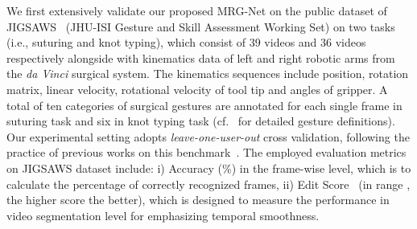 \documentclass[letterpaper, 10 pt, conference]{ieeeconf}
\begin{document}
We first extensively validate our proposed MRG-Net on the public dataset of JIGSAWS~\cite{gao2014jhu} (JHU-ISI Gesture and Skill Assessment Working Set) on two tasks (i.e., suturing and knot typing), which consist of 39 videos and 36 videos respectively alongside with kinematics data of left and right robotic arms from the \emph{da Vinci} surgical system.
The kinematics sequences include position, rotation matrix, linear velocity, rotational velocity of tool tip and angles of gripper.
A total of ten categories of surgical gestures are annotated for each single frame in suturing task and six in knot typing task (cf.~\cite{gao2014jhu} for detailed gesture definitions).
Our experimental setting adopts \emph{leave-one-user-out} cross validation, following the practice of previous works on this benchmark~\cite{ahmidi2017dataset}.
The employed evaluation metrics on JIGSAWS dataset include: i) Accuracy (\%) in the frame-wise level, which is to calculate the percentage of correctly recognized frames, ii) Edit Score~\cite{lea2016segmental}
(in range , the higher score the better), which is designed to measure the performance in video segmentation level for emphasizing temporal smoothness.
\end{document}

